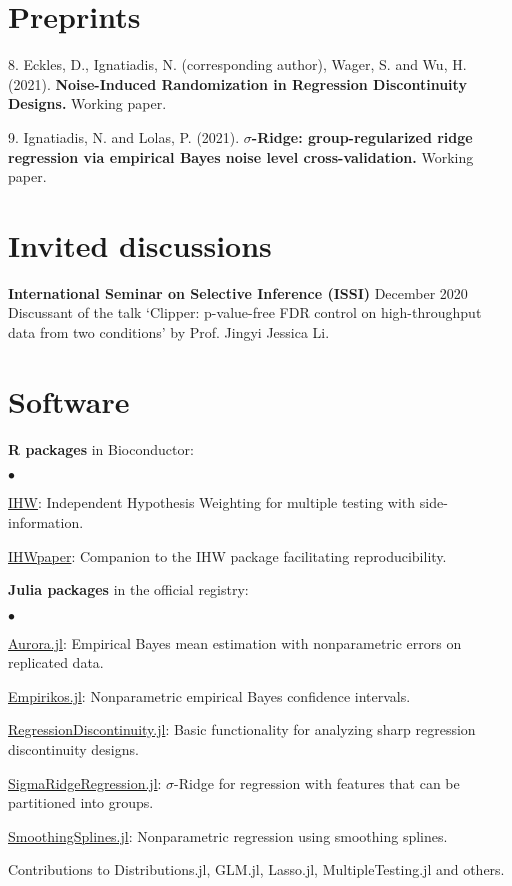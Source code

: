 \documentclass[margin,line]{res}
\newenvironment{list1}{
  \begin{list}{\ding{113}}{%
      \setlength{\itemsep}{0in}
      \setlength{\parsep}{0in} \setlength{\parskip}{0in}
      \setlength{\topsep}{0in} \setlength{\partopsep}{0in}
      \setlength{\leftmargin}{0.17in}}}{\end{list}}
\newenvironment{list2}{
  \begin{list}{$\bullet$}{%
      \setlength{\itemsep}{0in}
      \setlength{\parsep}{0in} \setlength{\parskip}{0in}
      \setlength{\topsep}{0in} \setlength{\partopsep}{0in}
      \setlength{\leftmargin}{0.2in}}}{\end{list}}
\begin{document}
\begin{resume}
\section{\sc Preprints}
\begin{list1}
\item[8.] Eckles, D., Ignatiadis, N. (corresponding author), Wager, S. and Wu, H. (2021). \textbf{Noise-Induced Randomization in Regression Discontinuity Designs.} Working paper.
\item[9.] Ignatiadis, N. and Lolas, P.  (2021). \textbf{$\sigma$-Ridge: group-regularized ridge regression via empirical Bayes noise level cross-validation.} Working paper.
\end{list1}


\section{\sc Invited discussions}
\textbf{International Seminar on Selective Inference (ISSI)} \hfill December 2020\\
Discussant of the talk `Clipper: p-value-free FDR control on high-throughput data from two conditions' 
by Prof. Jingyi Jessica Li.

\section{\sc Software}
{\bf R packages} in Bioconductor:
\begin{list2}
\item \href{https://bioconductor.org/packages/IHW}{{\color{urlblue} IHW}}:  Independent Hypothesis Weighting for multiple testing with side-information.
\item \href{https://bioconductor.org/packages/IHWpaper}{{\color{urlblue} IHWpaper}}: Companion to the IHW package facilitating reproducibility.
\end{list2}
{\bf Julia packages} in the official registry:
\begin{list2}
\item \href{https://github.com/nignatiadis/Aurora.jl}{{\color{urlblue} Aurora.jl}}: Empirical Bayes mean estimation with nonparametric errors on replicated data.
\item \href{https://github.com/nignatiadis/Empirikos.jl}{{\color{urlblue} Empirikos.jl}}: Nonparametric empirical Bayes confidence intervals.
\item \href{https://github.com/nignatiadis/RegressionDiscontinuity.jl}{{\color{urlblue}  RegressionDiscontinuity.jl}}: Basic functionality for analyzing sharp regression discontinuity designs. 
\item \href{https://github.com/nignatiadis/SigmaRidgeRegression.jl}{{\color{urlblue} SigmaRidgeRegression.jl}}: $\sigma$-Ridge for regression with features that can be partitioned into groups.
\item \href{https://github.com/nignatiadis/SmoothingSplines.jl}{{\color{urlblue} SmoothingSplines.jl}}: Nonparametric regression using smoothing splines.
\item Contributions to Distributions.jl, GLM.jl, Lasso.jl, MultipleTesting.jl and others.
\end{list2}



\end{resume}
\end{document}
